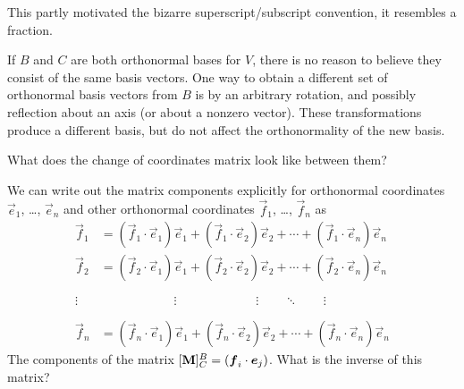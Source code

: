 This partly motivated the bizarre superscript/subscript convention, it
resembles a fraction.

If $B$ and $C$ are both orthonormal bases for $V$, there is no reason to
believe they consist of the same basis vectors. One way to obtain a
different set of orthonormal basis vectors from $B$ is by an arbitrary
rotation, and possibly reflection about an axis (or about a nonzero
vector). These transformations produce a different basis, but do not
affect the orthonormality of the new basis.

What does the change of coordinates matrix look like between them?

\M\label{chunk:basis:change-of-basis-matrix-among-orthonormal-bases}
We can write out the matrix components explicitly for orthonormal
coordinates $\vec{e}_{1}$, \dots, $\vec{e}_{n}$ and other orthonormal
coordinates $\vec{f}_{1}$, \dots, $\vec{f}_{n}$ as
\begin{align}
  \vec{f}_{1} &= (\vec{f}_{1}\cdot\vec{e}_{1})\vec{e}_{1} + (\vec{f}_{1}\cdot\vec{e}_{2})\vec{e}_{2} + \cdots + (\vec{f}_{1}\cdot\vec{e}_{n})\vec{e}_{n}\\
  \vec{f}_{2} &= (\vec{f}_{2}\cdot\vec{e}_{1})\vec{e}_{1} + (\vec{f}_{2}\cdot\vec{e}_{2})\vec{e}_{2} + \cdots + (\vec{f}_{2}\cdot\vec{e}_{n})\vec{e}_{n}\\
  \vdots &\mathrel{\phantom{=(\vec{f}_{2}\cdot\vec{e}_{1})}}\vdots\quad\phantom{+ (\vec{f}_{1}\cdot\vec{e}_{2})}\vdots\qquad\ddots\qquad\vdots\nonumber\\
  \vec{f}_{n} &= (\vec{f}_{n}\cdot\vec{e}_{1})\vec{e}_{1} + (\vec{f}_{n}\cdot\vec{e}_{2})\vec{e}_{2} + \cdots + (\vec{f}_{n}\cdot\vec{e}_{n})\vec{e}_{n}
\end{align}
The components of the matrix
$[\mathbf{M}]^{B}_{C}=(\boldsymbol{f}_{i}\cdot\boldsymbol{e}_{j})$.
What is the inverse of this matrix?

